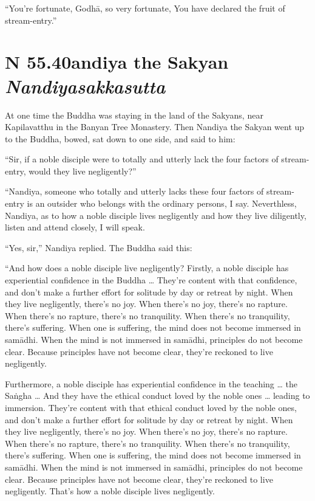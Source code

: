 \documentclass[12pt,openany]{book}%
\newcommand*{\suttatitleacronym}[1]{\smaller[2]{#1}\vspace*{.3em}}
\newcommand*{\suttatitletranslation}[1]{\linebreak{#1}}
\newcommand*{\suttatitleroot}[1]{\linebreak\smaller[2]\itshape{#1}}
\newcommand*{\tocacronym}[1]{\hspace*{-3.3em}{#1}\quad}
\newcommand*{\toctranslation}[1]{#1}
\newcommand*{\tocroot}[1]{(\textit{#1})}
\begin{document}
“You’re fortunate, \textsanskrit{Godhā}, so very fortunate, You have declared the fruit of stream-entry.” 

%
\section*{{\suttatitleacronym SN 55.40}{\suttatitletranslation Nandiya the Sakyan }{\suttatitleroot Nandiyasakkasutta}}
\addcontentsline{toc}{section}{\tocacronym{SN 55.40} \toctranslation{Nandiya the Sakyan } \tocroot{Nandiyasakkasutta}}

At one time the Buddha was staying in the land of the Sakyans, near Kapilavatthu in the Banyan Tree Monastery. Then Nandiya the Sakyan went up to the Buddha, bowed, sat down to one side, and said to him: 

“Sir, if a noble disciple were to totally and utterly lack the four factors of stream-entry, would they live negligently?” 

“Nandiya, someone who totally and utterly lacks these four factors of stream-entry is an outsider who belongs with the ordinary persons, I say. Neverthless, Nandiya, as to how a noble disciple lives negligently and how they live diligently, listen and attend closely, I will speak. 

“Yes, sir,” Nandiya replied. The Buddha said this: 

“And how does a noble disciple live negligently? Firstly, a noble disciple has experiential confidence in the Buddha … They’re content with that confidence, and don’t make a further effort for solitude by day or retreat by night. When they live negligently, there’s no joy. When there’s no joy, there’s no rapture. When there’s no rapture, there’s no tranquility. When there’s no tranquility, there’s suffering. When one is suffering, the mind does not become immersed in \textsanskrit{samādhi}. When the mind is not immersed in \textsanskrit{samādhi}, principles do not become clear. Because principles have not become clear, they’re reckoned to live negligently. 

Furthermore, a noble disciple has experiential confidence in the teaching … the \textsanskrit{Saṅgha} … And they have the ethical conduct loved by the noble ones … leading to immersion. They’re content with that ethical conduct loved by the noble ones, and don’t make a further effort for solitude by day or retreat by night. When they live negligently, there’s no joy. When there’s no joy, there’s no rapture. When there’s no rapture, there’s no tranquility. When there’s no tranquility, there’s suffering. When one is suffering, the mind does not become immersed in \textsanskrit{samādhi}. When the mind is not immersed in \textsanskrit{samādhi}, principles do not become clear. Because principles have not become clear, they’re reckoned to live negligently. That’s how a noble disciple lives negligently. 
\end{document}
